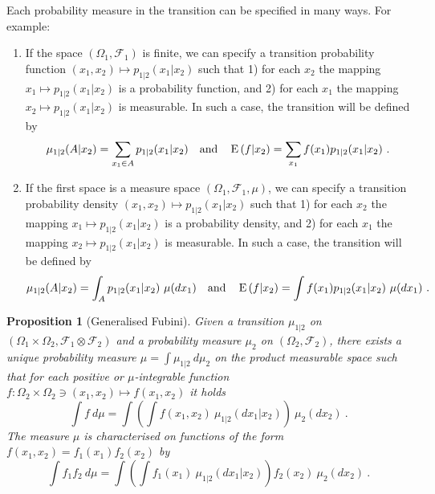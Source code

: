 \documentclass[12pt,a4paper]{amsart}
\theoremstyle{plain}%
\newtheorem{proposition}[thm]{Proposition}
\theoremstyle{definition}
\theoremstyle{remark}
\begin{document}
Each probability measure in the transition can be specified in many
ways. For example:
\begin{enumerate}
\item If the space $(\Omega_1,\mathcal F_1)$ is finite, we can specify
  a transition probability function $(x_1,x_2) \mapsto p_{1|2}(x_1|x_2)$ such that 1) for each $x_2$
  the mapping $x_1 \mapsto p_{1|2}(x_1|x_2)$ is a probability function, and
  2) for each $x_1$ the mapping $x_2 \mapsto p_{1|2}(x_1|x_2)$ is
  measurable. In such a case, the transition will be defined
  by \[\mu_{1|2}(A|x_2) = \sum_{x_1 \in A} p_{1|2}(x_1|x_2) \quad \text{and}
    \quad \condexp {f} {x_2} = \sum_{x_1} f(x_1) p_{1|2}(x_1|x_2) \ .  \]
\item If the first space is a measure space $(\Omega_1,\mathcal F_1,
  \mu)$, we can specify a transition probability density $(x_1,x_2) \mapsto p_{1|2}(x_1|x_2)$ such that 1) for each $x_2$
  the mapping $x_1 \mapsto p_{1|2}(x_1|x_2)$ is a probability density, and
  2) for each $x_1$ the mapping $x_2 \mapsto p_{1|2}(x_1|x_2)$ is
  measurable. In such a case, the transition will be defined
  by \[\mu_{1|2}(A|x_2) = \int_A p_{1|2}(x_1|x_2) \ \mu(dx_1) \quad \text{and}
    \quad \condexp {f} {x_2} = \int f(x_1) p_{1|2}(x_1|x_2) \ \mu(dx_1)\ .  \]
\end{enumerate}

\begin{proposition}[Generalised Fubini]
Given a transition $\mu_{1|2}$ on $(\Omega_1\times\Omega_2, \mathcal F_1 \otimes \mathcal F_2)$ and a probability measure $\mu_2$ on $(\Omega_2,\mathcal F_2)$, there exists a unique probability measure $\mu = \int \mu_{1|2} \ d\mu_2$ on the product measurable space such that for each positive or $\mu$-integrable function $f \colon \Omega_2\times\Omega_2 \ni (x_1,x_2) \mapsto f(x_1,x_2)$ it holds
\begin{equation*}
  \int f \ d\mu = \int \left(\int f(x_1,x_2) \ \mu_{1|2}(dx_1|x_2)\right) \ \mu_2(dx_2) \ .
\end{equation*}
The measure $\mu$ is characterised on functions of the form $f(x_1,x_2) = f_1(x_1)f_2(x_2)$ by 
\begin{equation*}
  \int f_1f_2 \ d\mu = \int \left(\int f_1(x_1) \ \mu_{1|2}(dx_1|x_2)\right)f_2(x_2) \ \mu_2(dx_2) \ .
\end{equation*}
\end{proposition}
\end{document}
